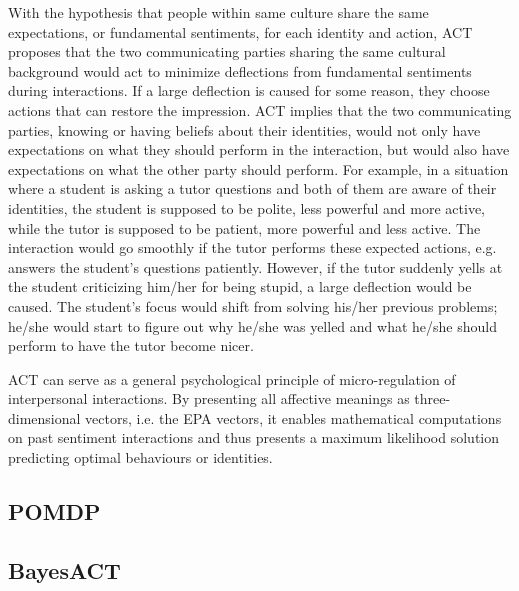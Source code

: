 With the hypothesis that people within same culture share the same expectations, or fundamental sentiments, for each identity and action, ACT proposes that the two communicating parties sharing the same cultural background would act to minimize deflections from fundamental sentiments during interactions. If a large deflection is caused for some reason, they choose actions that can restore the impression. ACT implies that the two communicating parties, knowing or having beliefs about their identities, would not only have expectations on what they should perform in the interaction, but would also have expectations on what the other party should perform. For example, in a situation where a student is asking a tutor questions and both of them are aware of their identities, the student is supposed to be polite, less powerful and more active, while the tutor is supposed to be patient, more powerful and less active. The interaction would go smoothly if the tutor performs these expected actions, e.g. answers the student's questions patiently. However, if the tutor suddenly yells at the student criticizing him/her for being stupid, a large deflection would be caused. The student's focus would shift from solving his/her previous problems; he/she would start to figure out why he/she was yelled and what he/she should perform to have the tutor become nicer.

ACT can serve as a general psychological principle of micro-regulation of interpersonal interactions. By presenting all affective meanings as three-dimensional vectors, i.e. the EPA vectors, it enables mathematical computations on past sentiment interactions and thus presents a maximum likelihood solution predicting optimal behaviours or identities. 

\subsection{POMDP}

\subsection{BayesACT}

